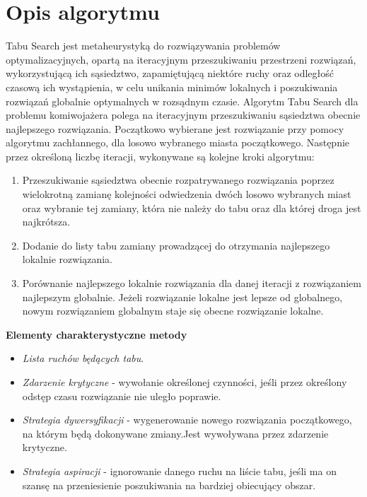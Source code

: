 \documentclass{article}
\begin{document}
\section{Opis algorytmu}
\par Tabu Search jest metaheurystyką do rozwiązywania problemów optymalizacyjnych, opartą na iteracyjnym przeszukiwaniu
przestrzeni rozwiązań, wykorzystującą ich sąsiedztwo, zapamiętującą niektóre ruchy oraz odległość czasową ich wystąpienia, w celu unikania minimów lokalnych i poszukiwania rozwiązań globalnie optymalnych w rozsądnym czasie.
\newline
\newline
Algorytm Tabu Search dla problemu komiwojażera polega na iteracyjnym przeszukiwaniu sąsiedztwa obecnie najlepszego rozwiązania. Początkowo wybierane jest rozwiązanie przy pomocy algorytmu zachłannego, dla losowo wybranego miasta początkowego. Następnie przez określoną liczbę iteracji, wykonywane są kolejne kroki algorytmu: 
	\begin{enumerate}
	\item Przeszukiwanie sąsiedztwa obecnie rozpatrywanego rozwiązania poprzez wielokrotną zamianę kolejności odwiedzenia dwóch losowo wybranych miast oraz wybranie tej zamiany, która nie należy do tabu oraz dla której droga jest najkrótsza.
	\item Dodanie do listy tabu zamiany prowadzącej do otrzymania najlepszego lokalnie rozwiązania.
	\item Porównanie najlepszego lokalnie rozwiązania dla danej iteracji z rozwiązaniem najlepszym globalnie. Jeżeli rozwiązanie lokalne jest lepsze od globalnego, nowym rozwiązaniem globalnym staje się obecne rozwiązanie lokalne.
\end{enumerate}

\textbf{Elementy charakterystyczne metody}
\begin{itemize}
	\item \textit{Lista ruchów będących tabu}.
	\item \textit{Zdarzenie krytyczne} - wywołanie określonej czynności, jeśli przez określony odstęp czasu rozwiązanie nie uległo poprawie.
	\item \textit{Strategia dywersyfikacji} - wygenerowanie nowego rozwiązania początkowego, na którym będą dokonywane zmiany.Jest wywoływana przez zdarzenie krytyczne.
	\item \textit{Strategia aspiracji} - ignorowanie danego ruchu na liście tabu, jeśli ma on szansę na przeniesienie poszukiwania na bardziej obiecujący obszar.
\end{itemize}
\newpage
\end{document}

